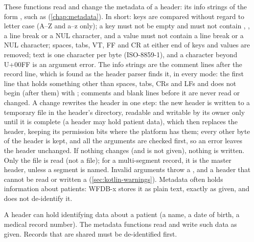 These functions read and change the metadata of a header: its info strings of the form
, such as  (\cref{chap:metadata}). In short: keys are
compared without regard to letter case (A--Z and a--z only); a key must not be empty and
must not contain \code{:}, \code{\#}, a line break or a NUL character, and a value must
not contain a line break or a NUL character; spaces, tabs, VT, FF and CR at either end of
keys and values are removed; text is one character per byte (ISO-8859-1), and a character
beyond U+00FF is an argument error. The info strings are the comment lines after the
record line, which is found as the header parser finds it, in every mode: the first line
that holds something other than spaces, tabs, CRs and LFs and does not begin (after them)
with \code{\#}; comments and blank lines before it are never read or changed. A change
rewrites the header in one step: the new header is written to a temporary file in the
header's directory, readable and writable by its owner only until it is complete (a
header may hold patient data), which then replaces the header, keeping its permission
bits where the platform has them; every other byte of the
header is kept, and all the arguments are checked first, so an error leaves the header
unchanged. If nothing changes (and  is not given), nothing is written. Only the
 file is read (not a  file); for a multi-segment record, it is the
master header, unless a segment is named. Invalid arguments throw a
, and a header that cannot be read or written a
 (\cref{sec:kotlin-warnings}). Metadata often holds information about
patients: WFDB-x stores it as plain text, exactly as given, and does not de-identify it.

\begin{phibox}
A header can hold identifying data about a patient (a name, a date of birth, a medical
record number). The metadata functions read and write such data as given. Records that
are shared must be de-identified first.
\end{phibox}

